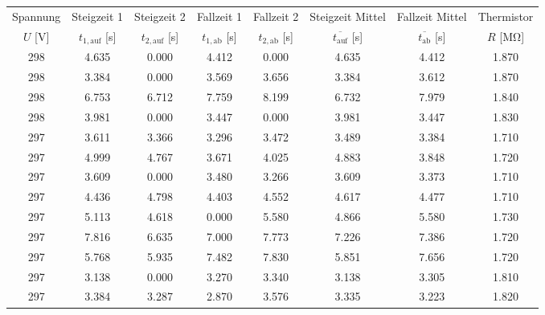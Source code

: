 \begin{table}[!h]
	\centering
	\begin{adjustbox}{width=\textwidth,center}
		\begin{tabular}{|c|c|c|c|c|c|c|c|}
		\hline
		Spannung & Steigzeit 1 & Steigzeit 2 & Fallzeit 1 & Fallzeit 2 & Steigzeit Mittel & Fallzeit Mittel & Thermistor\\
		$U$ [\si{\volt}] & $t_{1,\text{auf}}$ [\si{\second}] & $t_{2,\text{auf}}$ [\si{\second}] & $t_{1,\text{ab}}$ [\si{\second}] & $t_{2,\text{ab}}$ [\si{\second}] & $\overline{t_{\text{auf}}}$ [\si{\second}] & $\overline{t_{\text{ab}}}$ [\si{\second}] & $R$ [\si{\mega\ohm}]\\
\hline\hline
		\num{298} & \num{4.635} & \num{0.000} & \num{4.412} & \num{0.000} & \num{4.635} & \num{4.412} & \num{1.870}\\
		\num{298} & \num{3.384} & \num{0.000} & \num{3.569} & \num{3.656} & \num{3.384} & \num{3.612} & \num{1.870}\\
		\num{298} & \num{6.753} & \num{6.712} & \num{7.759} & \num{8.199} & \num{6.732} & \num{7.979} & \num{1.840}\\
		\num{298} & \num{3.981} & \num{0.000} & \num{3.447} & \num{0.000} & \num{3.981} & \num{3.447} & \num{1.830}\\
		\num{297} & \num{3.611} & \num{3.366} & \num{3.296} & \num{3.472} & \num{3.489} & \num{3.384} & \num{1.710}\\
		\num{297} & \num{4.999} & \num{4.767} & \num{3.671} & \num{4.025} & \num{4.883} & \num{3.848} & \num{1.720}\\
		\num{297} & \num{3.609} & \num{0.000} & \num{3.480} & \num{3.266} & \num{3.609} & \num{3.373} & \num{1.710}\\
		\num{297} & \num{4.436} & \num{4.798} & \num{4.403} & \num{4.552} & \num{4.617} & \num{4.477} & \num{1.710}\\
		\num{297} & \num{5.113} & \num{4.618} & \num{0.000} & \num{5.580} & \num{4.866} & \num{5.580} & \num{1.730}\\
		\num{297} & \num{7.816} & \num{6.635} & \num{7.000} & \num{7.773} & \num{7.226} & \num{7.386} & \num{1.720}\\
		\num{297} & \num{5.768} & \num{5.935} & \num{7.482} & \num{7.830} & \num{5.851} & \num{7.656} & \num{1.720}\\
		\num{297} & \num{3.138} & \num{0.000} & \num{3.270} & \num{3.340} & \num{3.138} & \num{3.305} & \num{1.810}\\
		\num{297} & \num{3.384} & \num{3.287} & \num{2.870} & \num{3.576} & \num{3.335} & \num{3.223} & \num{1.820}\\

\end{tabular}
\end{adjustbox}
\end{table}
